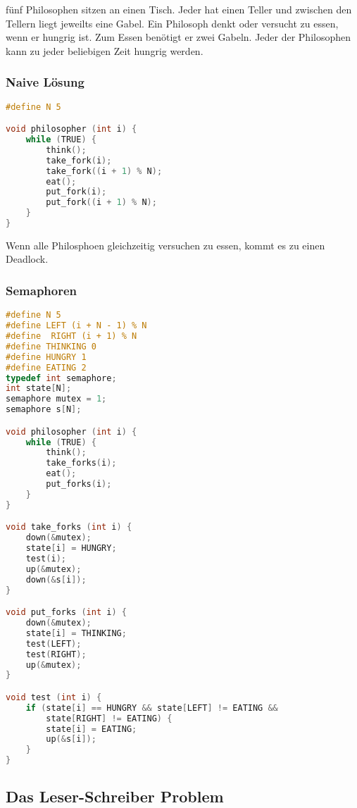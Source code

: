 fünf Philosophen sitzen an einen Tisch. Jeder hat einen Teller und zwischen den
Tellern liegt jeweilts eine Gabel. Ein Philosoph denkt oder versucht zu essen,
wenn er hungrig ist. Zum Essen benötigt er zwei Gabeln. Jeder der Philosophen
kann zu jeder beliebigen Zeit hungrig werden.

\subsubsection{Naive Lösung}

\begin{lstlisting}[language=C]
#define N 5

void philosopher (int i) {
    while (TRUE) {
        think();
        take_fork(i);
        take_fork((i + 1) % N);
        eat();
        put_fork(i);
        put_fork((i + 1) % N);
    }
} 
\end{lstlisting}

Wenn alle Philosphoen gleichzeitig versuchen zu essen, kommt es zu einen
Deadlock.

\subsubsection{Semaphoren}

\begin{lstlisting}[language=C]
#define N 5
#define LEFT (i + N - 1) % N
#define  RIGHT (i + 1) % N
#define THINKING 0
#define HUNGRY 1
#define EATING 2
typedef int semaphore;
int state[N];
semaphore mutex = 1;
semaphore s[N];

void philosopher (int i) {
    while (TRUE) {
        think();
        take_forks(i);
        eat();
        put_forks(i);
    }
} 

void take_forks (int i) {
    down(&mutex);
    state[i] = HUNGRY;
    test(i);
    up(&mutex);
    down(&s[i]);
} 

void put_forks (int i) {
    down(&mutex);
    state[i] = THINKING;
    test(LEFT);
    test(RIGHT);
    up(&mutex);
} 

void test (int i) {
    if (state[i] == HUNGRY && state[LEFT] != EATING &&
        state[RIGHT] != EATING) {
        state[i] = EATING;
        up(&s[i]);
    }
} 
\end{lstlisting}

\subsection{Das Leser-Schreiber Problem}

